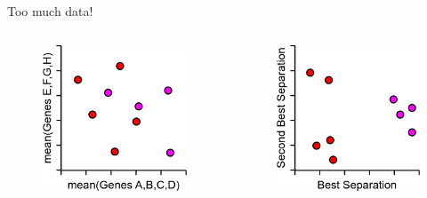 \begin{frame}[allowframebreaks]{Too much data!}
\begin{columns}
\begin{column}{0.33\textwidth}
\begin{figure}
            \includegraphics[width=1\textwidth,keepaspectratio]{images/dul/genes-mean.png}
        \end{figure}
    \end{column}
    \begin{column}{0.33\textwidth}
        \begin{figure}
            \centering
            \includegraphics[width=1\textwidth,keepaspectratio]{images/dul/genes-separations.png}
        \end{figure}
    \end{column}
\end{columns}
\end{frame}



